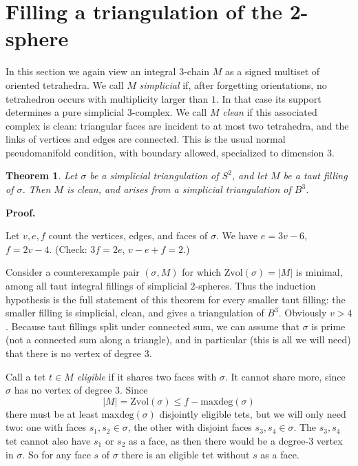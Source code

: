 \documentclass[12pt]{article}
\newtheorem{theorem}{Theorem}
\newcommand{\proofstart}{{\noindent \bf Proof.\ }}
\newcommand{\kw}{\mathrm}
\newcommand{\maxdeg}{\kw{maxdeg}}
\newcommand{\Zvol}{\kw{Zvol}}
\begin{document}
{\color{blue}
\section{Filling a triangulation of the 2-sphere}

In this section we again view an integral $3$-chain $M$ as a signed
multiset of oriented tetrahedra. We call $M$ \emph{simplicial} if,
after forgetting orientations, no tetrahedron occurs with multiplicity
larger than $1$. In that case its support determines a pure simplicial
$3$-complex. We call $M$ \emph{clean} if this associated complex is
clean: triangular faces are incident to at most two tetrahedra, and the
links of vertices and edges are connected. This is the usual normal
pseudomanifold condition, with boundary allowed, specialized to dimension
$3$.

\begin{theorem} \label{th2}
Let $\sigma$ be a simplicial triangulation of $S^2$,
and let $M$ be a taut filling of $\sigma$.
Then $M$ is clean, and arises from
a simplicial triangulation of $B^3$.
\end{theorem}

\proofstart

Let $v,e,f$ count the vertices, edges, and faces of $\sigma$.
We have
$e=3v-6$, $f=2v-4$.
(Check: $3f=2e$, $v-e+f=2$.)

Consider a counterexample pair $(\sigma,M)$ for which
$\Zvol(\sigma)=|M|$ is minimal, among all taut integral fillings
of simplicial $2$-spheres.  Thus the induction hypothesis is the full
statement of this theorem for every smaller taut filling: the smaller
filling is simplicial, clean, and gives a triangulation of $B^3$.
Obviously $v>4$.
Because taut fillings split under connected sum,
we can assume that $\sigma$ is prime
(not a connected sum along a triangle),
and in particular (this is all we will need) that there is no
vertex of degree $3$.

Call a tet $t \in M$ \emph{eligible} if it shares two faces
with $\sigma$. It cannot share more, since $\sigma$ has no vertex of
degree $3$.
Since
\[
|M| = \Zvol(\sigma) \leq f-\maxdeg(\sigma) 
\]
there must be at least $\maxdeg(\sigma)$ disjointly eligible tets,
but we will only need two:
one with faces $s_1,s_2 \in \sigma$,
the other with disjoint faces $s_3,s_4 \in \sigma$.
The $s_3,s_4$ tet cannot also have $s_1$ or $s_2$ as a face,
as then there would be a degree-$3$ vertex in $\sigma$.
So for any face $s$ of $\sigma$
there is an eligible tet without $s$ as a face.

}
\end{document}
